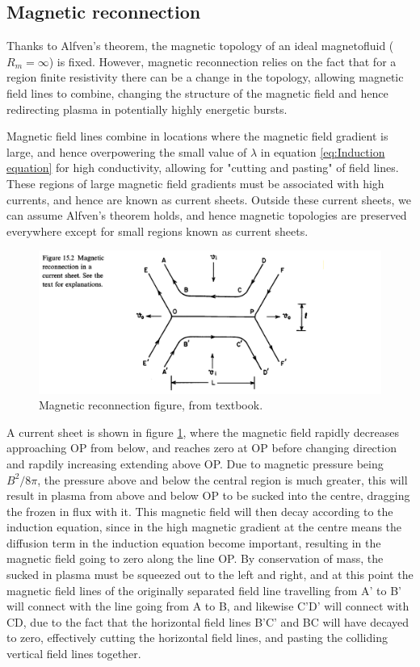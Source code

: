 \documentclass{article}
\begin{document}
\subsection{Magnetic reconnection}
Thanks to Alfven's theorem, the magnetic topology of an ideal magnetofluid ($R_m=\infty$) is fixed. However, magnetic reconnection relies on the fact that for a region finite resistivity there can be a change in the topology, allowing magnetic field lines to combine, changing the structure of the magnetic field and hence redirecting plasma in potentially highly energetic bursts.

Magnetic field lines combine in locations where the magnetic field gradient is large, and hence overpowering the small value of $\lambda$ in equation \ref{eq:Induction equation} for high conductivity, allowing for "cutting and pasting" of field lines. These regions of large magnetic field gradients must be associated with high currents, and hence are known as current sheets. Outside these current sheets, we can assume Alfven's theorem holds, and hence magnetic topologies are preserved everywhere except for small regions known as current sheets.

\begin{figure}
    \centering
    \includegraphics{images/magnetic_reconnection.png}
    \caption{Magnetic reconnection figure, from textbook.}
    \label{fig:Magnetic reconnection, from textbook}
\end{figure}

A current sheet is shown in figure \ref{fig:Magnetic reconnection, from textbook}, where the magnetic field rapidly decreases approaching OP from below, and reaches zero at OP before changing direction and rapdily increasing extending above OP. Due to magnetic pressure being $B^2 / 8\pi$, the pressure above and below the central region is much greater, this will result in plasma from above and below OP to be sucked into the centre, dragging the frozen in flux with it. This magnetic field will then decay according to the induction equation, since in the high magnetic gradient at the centre means the diffusion term in the induction equation become important, resulting in the magnetic field going to zero along the line OP. By conservation of mass, the sucked in plasma must be squeezed out to the left and right, and at this point the magnetic field lines of the originally separated field line travelling from A' to B' will connect with  the line going from  A to B, and likewise C'D' will connect with CD, due to the fact that the horizontal field lines B'C' and BC will have decayed to zero, effectively cutting the horizontal field lines, and pasting the colliding vertical field lines together.
\end{document}
